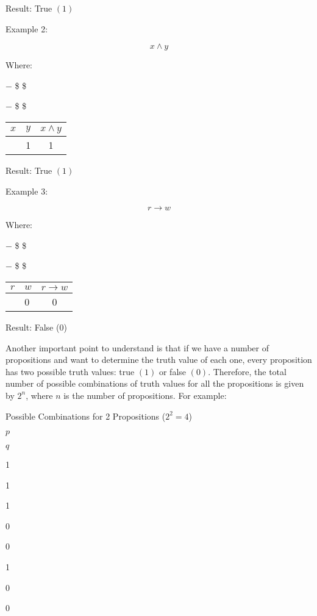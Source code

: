 Result: True \((1)\)

Example 2:

\[x \land y\]

Where:

− \$ \$

− \$ \$

\begin{longtable}[]{@{}llc@{}}
\toprule\noalign{}
\(x\) & \(y\) & \(x \land y\) \\
\midrule\noalign{}
\endhead
\bottomrule\noalign{}
\endlastfoot
1 & 1 & 1 \\
\end{longtable}

Result: True \((1)\)

Example 3:

\[r \rightarrow w\]

Where:

− \$ \$

− \$ \$

\begin{longtable}[]{@{}llc@{}}
\toprule\noalign{}
\(r\) & \(w\) & \(r \rightarrow w\) \\
\midrule\noalign{}
\endhead
\bottomrule\noalign{}
\endlastfoot
1 & 0 & 0 \\
\end{longtable}

Result: False (0)

Another important point to understand is that if we have a number of
propositions and want to determine the truth value of each one, every
proposition has two possible truth values: true \((1)\) or false
\((0)\). Therefore, the total number of possible combinations of truth
values for all the propositions is given by \(2^n\), where \(n\) is the
number of propositions. For example:

Possible Combinations for 2 Propositions (\(2^2 = 4\))

\(p\)

\(q\)

1

1

1

0

0

1

0

0

